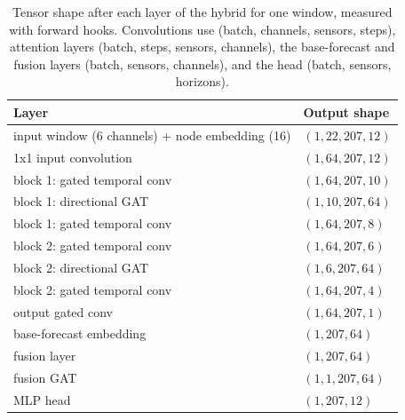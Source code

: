 \begin{table}[H]
\centering
\caption{Tensor shape after each layer of the hybrid for one window, measured with forward hooks. Convolutions use (batch, channels, sensors, steps), attention layers (batch, steps, sensors, channels), the base-forecast and fusion layers (batch, sensors, channels), and the head (batch, sensors, horizons).}
\label{tab:hybridshapes}
\small
\begin{tabular}{ll}
\toprule
Layer & Output shape \\
\midrule
input window (6 channels) + node embedding (16) & $(1, 22, 207, 12)$ \\
1x1 input convolution & $(1, 64, 207, 12)$ \\
block 1: gated temporal conv & $(1, 64, 207, 10)$ \\
block 1: directional GAT & $(1, 10, 207, 64)$ \\
block 1: gated temporal conv & $(1, 64, 207, 8)$ \\
block 2: gated temporal conv & $(1, 64, 207, 6)$ \\
block 2: directional GAT & $(1, 6, 207, 64)$ \\
block 2: gated temporal conv & $(1, 64, 207, 4)$ \\
output gated conv & $(1, 64, 207, 1)$ \\
base-forecast embedding & $(1, 207, 64)$ \\
fusion layer & $(1, 207, 64)$ \\
fusion GAT & $(1, 1, 207, 64)$ \\
MLP head & $(1, 207, 12)$ \\
\bottomrule
\end{tabular}
\end{table}